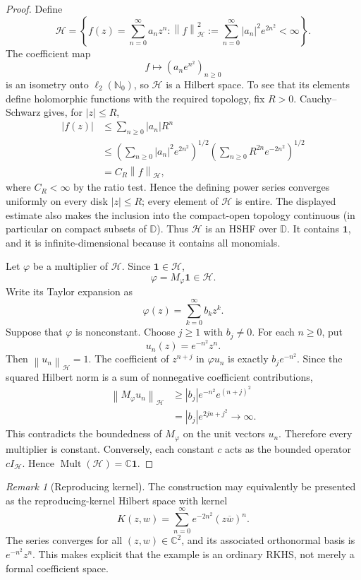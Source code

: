 \documentclass[11pt]{article}
\theoremstyle{definition}
\theoremstyle{remark}
\newtheorem*{remark}{Remark}
\newcommand{\C}{\mathbb C}
\newcommand{\D}{\mathbb D}
\newcommand{\Nzero}{\mathbb N_0}
\newcommand{\Hcal}{\mathcal H}
\newcommand{\Mult}{\operatorname{Mult}}
\newcommand{\norm}[1]{\left\lVert #1\right\rVert}
\begin{document}
\begin{proof}
Define
\[
  \Hcal=\left\{f(z)=\sum_{n=0}^{\infty}a_nz^n:
  \norm{f}_{\Hcal}^{2}:=\sum_{n=0}^{\infty}|a_n|^2e^{2n^2}<\infty\right\}.
\]
The coefficient map
\[
  f\longmapsto (a_ne^{n^2})_{n\geq0}
\]
is an isometry onto $\ell_2(\Nzero)$, so $\Hcal$ is a Hilbert space.  To see
that its elements define holomorphic functions with the required topology,
fix $R>0$.  Cauchy--Schwarz gives, for $|z|\leq R$,
\begin{align*}
 |f(z)|
 &\leq \sum_{n\geq0}|a_n|R^n \\
 &\leq \left(\sum_{n\geq0}|a_n|^2e^{2n^2}\right)^{1/2}
       \left(\sum_{n\geq0}R^{2n}e^{-2n^2}\right)^{1/2} \\
 &= C_R\norm{f}_{\Hcal},
\end{align*}
where $C_R<\infty$ by the ratio test.  Hence the defining power series
converges uniformly on every disk $|z|\leq R$; every element of $\Hcal$ is
entire.  The displayed estimate also makes the inclusion into the
compact-open topology continuous (in particular on compact subsets of
$\D$).  Thus $\Hcal$ is an HSHF over $\D$.  It contains $\mathbf1$, and it is
infinite-dimensional because it contains all monomials.

Let $\varphi$ be a multiplier of $\Hcal$.  Since $\mathbf1\in\Hcal$,
\[
  \varphi=M_\varphi\mathbf1\in\Hcal.
\]
Write its Taylor expansion as
\[
  \varphi(z)=\sum_{k=0}^{\infty}b_kz^k.
\]
Suppose that $\varphi$ is nonconstant.  Choose $j\geq1$ with $b_j\neq0$.
For each $n\geq0$, put
\[
  u_n(z)=e^{-n^2}z^n.
\]
Then $\norm{u_n}_{\Hcal}=1$.  The coefficient of $z^{n+j}$ in
$\varphi u_n$ is exactly $b_je^{-n^2}$.  Since the squared Hilbert norm is a
sum of nonnegative coefficient contributions,
\begin{align*}
  \norm{M_\varphi u_n}_{\Hcal}
  &\geq |b_j|e^{-n^2}e^{(n+j)^2} \\
  &=|b_j|e^{2jn+j^2}\longrightarrow\infty.
\end{align*}
This contradicts the boundedness of $M_\varphi$ on the unit vectors $u_n$.
Therefore every multiplier is constant.  Conversely, each constant $c$ acts
as the bounded operator $cI_{\Hcal}$.  Hence
$\Mult(\Hcal)=\C\mathbf1$.
\end{proof}

\begin{remark}[Reproducing kernel]
The construction may equivalently be presented as the reproducing-kernel
Hilbert space with kernel
\[
  K(z,w)=\sum_{n=0}^{\infty}e^{-2n^2}(z\overline w)^n.
\]
The series converges for all $(z,w)\in\C^2$, and its associated orthonormal
basis is $e^{-n^2}z^n$.  This makes explicit that the example is an ordinary
RKHS, not merely a formal coefficient space.
\end{remark}
\end{document}
